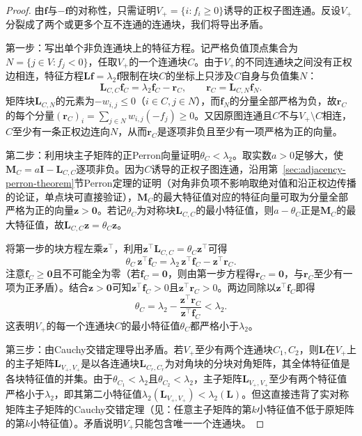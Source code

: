 \begin{proof}
由$\bm f$与$-\bm f$的对称性，只需证明$V_+=\{i:f_i\geq 0\}$诱导的正权子图连通。反设$V_+$分裂成了两个或更多个互不连通的连通块，我们将导出矛盾。

第一步：写出单个非负连通块上的特征方程。记严格负值顶点集合为$N=\{j\in V:f_j<0\}$，任取$V_+$的一个连通块$C$。由于$V_+$的不同连通块之间没有正权边相连，特征方程$\bm L\bm f=\lambda_2\bm f$限制在块$C$的坐标上只涉及$C$自身与负值集$N$：
\[
  \bm L_{C,C}\bm f_C = \lambda_2\bm f_C - \bm r_C,
  \qquad
  \bm r_C = \bm L_{C,N}\bm f_N.
\]
矩阵块$\bm L_{C,N}$的元素为$-w_{i,j}\leq 0$（$i\in C,j\in N$），而$\bm f_N$的分量全部严格为负，故$\bm r_C$的每个分量$(\bm r_C)_i=\sum_{j\in N}w_{i,j}(-f_j)\geq 0$。又因原图连通且$C$不与$V_+\setminus C$相连，$C$至少有一条正权边连向$N$，从而$\bm r_C$是逐项非负且至少有一项严格为正的向量。

第二步：利用块主子矩阵的正Perron向量证明$\theta_C<\lambda_2$。取实数$a>0$足够大，使$\bm M_C=a\bm I-\bm L_{C,C}$逐项非负。因为$C$诱导的正权子图连通，沿用第~\ref{sec:adjacency-perron-theorem}节Perron定理的证明（对角非负项不影响取绝对值和沿正权边传播的论证，单点块可直接验证），$\bm M_C$的最大特征值对应的特征向量可取为分量全部严格为正的向量$\bm z>\bm 0$。若记$\theta_C$为对称块$\bm L_{C,C}$的最小特征值，则$a-\theta_C$正是$\bm M_C$的最大特征值，故$\bm L_{C,C}\bm z=\theta_C\bm z$。

将第一步的块方程左乘$\bm z^\top$，利用$\bm z^\top\bm L_{C,C}=\theta_C\bm z^\top$可得
\[
  \theta_C\,\bm z^\top\bm f_C
  = \lambda_2\,\bm z^\top\bm f_C - \bm z^\top\bm r_C.
\]
注意$\bm f_C\geq\bm 0$且不可能全为零（若$\bm f_C=\bm 0$，则由第一步方程得$\bm r_C=\bm 0$，与$\bm r_C$至少有一项为正矛盾）。结合$\bm z>\bm 0$可知$\bm z^\top\bm f_C>0$且$\bm z^\top\bm r_C>0$。两边同除以$\bm z^\top\bm f_C$即得
\[
  \theta_C = \lambda_2 - \frac{\bm z^\top\bm r_C}{\bm z^\top\bm f_C} < \lambda_2.
\]
这表明$V_+$的每一个连通块$C$的最小特征值$\theta_C$都严格小于$\lambda_2$。

第三步：由Cauchy交错定理导出矛盾。若$V_+$至少有两个连通块$C_1,C_2$，则$\bm L$在$V_+$上的主子矩阵$\bm L_{V_+,V_+}$是以各连通块$\bm L_{C_r,C_r}$为对角块的分块对角矩阵，其全体特征值是各块特征值的并集。由于$\theta_{C_1}<\lambda_2$且$\theta_{C_2}<\lambda_2$，主子矩阵$\bm L_{V_+,V_+}$至少有两个特征值严格小于$\lambda_2$，即其第二小特征值$\lambda_2(\bm L_{V_+,V_+})<\lambda_2(\bm L)$。但这直接违背了实对称矩阵主子矩阵的Cauchy交错定理（见：任意主子矩阵的第$k$小特征值不低于原矩阵的第$k$小特征值）。矛盾说明$V_+$只能包含唯一一个连通块。
\end{proof}

